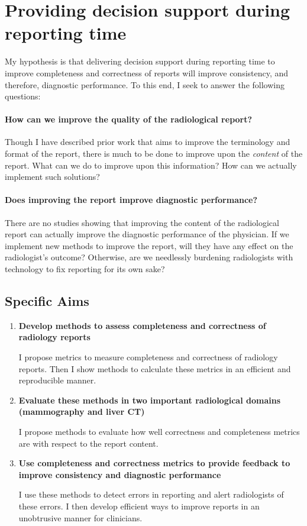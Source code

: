 \section{Providing decision support during reporting time}

My hypothesis is that delivering decision support during reporting time to improve completeness and correctness of reports will improve consistency, and therefore, diagnostic performance. To this end, I seek to answer the following questions:

\paragraph{How can we improve the quality of the radiological report?}

Though I have described prior work that aims to improve the terminology and format of the report, there is much to be done to improve upon the \emph{content} of the report. What can we do to improve upon this information? How can we actually implement such solutions?

\paragraph{Does improving the report improve diagnostic performance?}

There are no studies showing that improving the content of the radiological report can actually improve the diagnostic performance of the physician. If we implement new methods to improve the report, will they have any effect on the radiologist's outcome? Otherwise, are we needlessly burdening radiologists with technology to fix reporting for its own sake?

\subsection{Specific Aims}

\begin{enumerate}
	\item \textbf{Develop methods to assess completeness and correctness of radiology reports}
	
	I propose metrics to measure completeness and correctness of radiology reports. Then I show methods to calculate these metrics in an efficient and reproducible manner.
	
	\item \textbf{Evaluate these methods in two important radiological domains (mammography and liver CT)}
	
	I propose methods to evaluate how well correctness and completeness metrics are with respect to the report content.
	
	\item \textbf{Use completeness and correctness metrics to provide feedback to improve consistency and diagnostic performance}
	
	I use these methods to detect errors in reporting and alert radiologists of these errors. I then develop efficient ways to improve reports in an unobtrusive manner for clinicians.
\end{enumerate}

